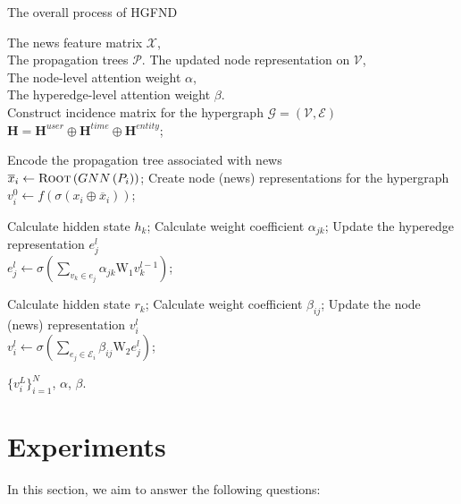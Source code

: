 \documentclass[conference]{IEEEtran}
\begin{document}
\begin{algorithm}
\caption{The overall process of HGFND}
\begin{algorithmic}[1]
\REQUIRE The news feature matrix $\mathcal{X}$,\\
\hspace*{1.2em} The propagation trees $\mathcal{P}$. 
\ENSURE The updated node representation on $\mathcal{V}$,\\
\hspace*{1.9em} The node-level attention weight $\alpha$,\\
\hspace*{1.9em} The hyperedge-level attention weight $\beta$.\\
\STATE Construct incidence matrix for the hypergraph $\mathcal{G}=(\mathcal{V}, \mathcal{E})$\\
$\mathbf{H} = \mathbf{H}^{user} \oplus \mathbf{H}^{time} \oplus \mathbf{H}^{entity}$;

\STATE Encode the propagation tree associated with news\\
$\overline{x}_i \leftarrow \textsc{Root}\left(GNN\left( P_i \right)\right)$;
\STATE Create node (news) representations for the hypergraph \\
${v}^0_{i} \leftarrow \textit{f} \left(\sigma \left( x_i \oplus \overline{x}_i \right)\right)$;

\ENDFOR
{}

\STATE Calculate hidden state $h_k$;
\STATE Calculate weight coefficient $\alpha_{jk}$;
\STATE Update the hyperedge representation $e^l_j$\\
$e^{l}_{j} \leftarrow \sigma \left(  \sum_{v_{k} \in e_{j}} \alpha_{jk} \mathrm{W_{1}} v^{l-1}_{k} \right)$;
\ENDFOR

\STATE Calculate hidden state $r_k$;
\STATE Calculate weight coefficient $\beta_{ij}$;
\STATE Update the node (news) representation $v^l_i$\\
$v^{l}_{i} \leftarrow  \sigma \left(  \sum_{e_{j} \in \mathcal{E}_{i}} \beta_{ij} \mathrm{W_{2}} e^{l}_{j} \right)$;
\ENDFOR

\ENDFOR
\RETURN {} $\{v^ \mathit{L}_i\}^{\mathit{N}}_{i=1}$, $\alpha$, $\beta$.
\end{algorithmic}

\end{algorithm}

\section{Experiments}
In this section, we aim to answer the following  questions:
\end{document}
